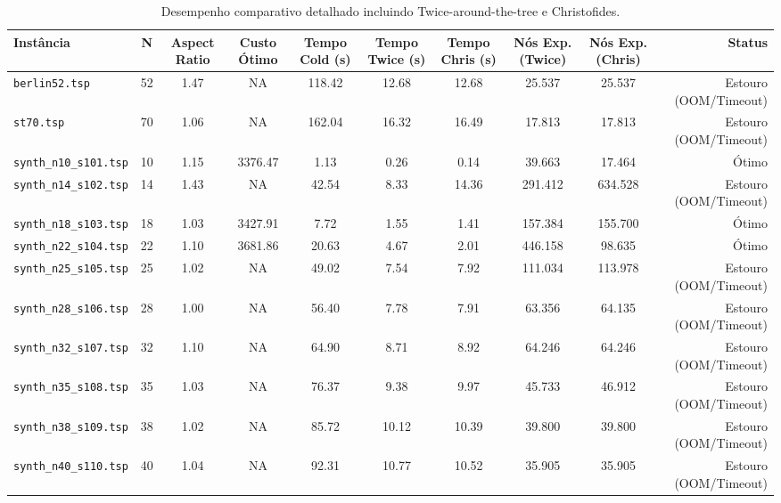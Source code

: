 \begin{table}
\caption{Desempenho comparativo detalhado incluindo Twice-around-the-tree e Christofides.}
\label{tab:resultados_instancias}
\begin{tabular}{lccccccccr}
\toprule
Instância & N & Aspect Ratio & Custo Ótimo & Tempo Cold (s) & Tempo Twice (s) & Tempo Chris (s) & Nós Exp. (Twice) & Nós Exp. (Chris) & Status \\
\midrule
\texttt{berlin52.tsp} & 52 & 1.47 & NA & 118.42 & 12.68 & 12.68 & 25.537 & 25.537 & Estouro (OOM/Timeout) \\
\texttt{st70.tsp} & 70 & 1.06 & NA & 162.04 & 16.32 & 16.49 & 17.813 & 17.813 & Estouro (OOM/Timeout) \\
\texttt{synth_n10_s101.tsp} & 10 & 1.15 & 3376.47 & 1.13 & 0.26 & 0.14 & 39.663 & 17.464 & Ótimo \\
\texttt{synth_n14_s102.tsp} & 14 & 1.43 & NA & 42.54 & 8.33 & 14.36 & 291.412 & 634.528 & Estouro (OOM/Timeout) \\
\texttt{synth_n18_s103.tsp} & 18 & 1.03 & 3427.91 & 7.72 & 1.55 & 1.41 & 157.384 & 155.700 & Ótimo \\
\texttt{synth_n22_s104.tsp} & 22 & 1.10 & 3681.86 & 20.63 & 4.67 & 2.01 & 446.158 & 98.635 & Ótimo \\
\texttt{synth_n25_s105.tsp} & 25 & 1.02 & NA & 49.02 & 7.54 & 7.92 & 111.034 & 113.978 & Estouro (OOM/Timeout) \\
\texttt{synth_n28_s106.tsp} & 28 & 1.00 & NA & 56.40 & 7.78 & 7.91 & 63.356 & 64.135 & Estouro (OOM/Timeout) \\
\texttt{synth_n32_s107.tsp} & 32 & 1.10 & NA & 64.90 & 8.71 & 8.92 & 64.246 & 64.246 & Estouro (OOM/Timeout) \\
\texttt{synth_n35_s108.tsp} & 35 & 1.03 & NA & 76.37 & 9.38 & 9.97 & 45.733 & 46.912 & Estouro (OOM/Timeout) \\
\texttt{synth_n38_s109.tsp} & 38 & 1.02 & NA & 85.72 & 10.12 & 10.39 & 39.800 & 39.800 & Estouro (OOM/Timeout) \\
\texttt{synth_n40_s110.tsp} & 40 & 1.04 & NA & 92.31 & 10.77 & 10.52 & 35.905 & 35.905 & Estouro (OOM/Timeout) \\
\bottomrule
\end{tabular}
\end{table}
